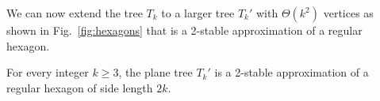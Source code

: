 \documentclass[runningheads]{article}
\begin{document}

We can now extend the tree $T_k$ to a larger tree $T_k'$ with $\Theta(k^2)$ vertices as shown in Fig.~\ref{fig:hexagons}
that is a 2-stable approximation of a regular hexagon.
%
\begin{lemma}\label{lem:stablehex}
For every integer $k\geq 3$, the plane tree $T_k'$
is a 2-stable approximation of a regular hexagon of side length $2k$.
\end{lemma}
\end{document}
